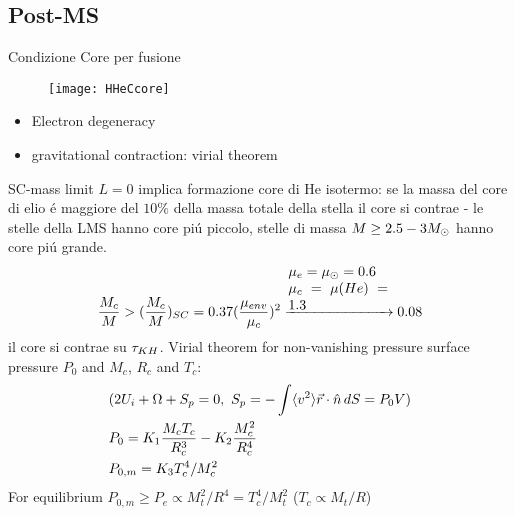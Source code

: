 \subsection{Post-MS}

\begin{frame}{Condizione Core per fusione}
\begin{figure}[!ht]
\texttt{[image: HHeCcore]}\label{fig:HHeCcore}
\end{figure}
\begin{itemize}
    \item Electron degeneracy
    \item gravitational contraction: virial theorem
\end{itemize}
\end{frame}

\begin{frame}{SC-mass limit}
$L=0$ implica formazione core di He isotermo: se la massa del core di elio \'e maggiore del $10\%$ della massa totale della stella il core si contrae - le stelle della LMS hanno core pi\'u piccolo, stelle di massa $M\geq2.5-3M_{\odot}{}$  hanno core pi\'u grande.
\begin{equation*}
\frac{M_c}{M}>(\frac{M_c}{M})_{SC}=0.37(\frac{\mu_{env}}{\mu_c})^2\xrightarrow{\parbox{2.5cm}{$\mu_e=\mu_{\odot}=0.6$\\$\mu_c=\mu(He)=1.3$}}0.08
\end{equation*}
il core si contrae su $\tau_{KH}{}$.
Virial theorem for non-vanishing pressure surface pressure $P_0$ and $M_c$, $R_c$ and $T_c$:
\begin{align*}
&(2U_i+\Omega+S_p=0,\ S_p=-\int\exv{v^2}\Vec{r}\cdot\hat{n}\,dS=P_0V)\\
&P_0=K_1\frac{M_cT_c}{R_c^3}-K_2\frac{M_c^2}{R_c^4}\\
&P_{0,m}=K_3T_c^4/M_c^2
\end{align*}
For equilibrium $P_{0,m}\geq P_e\propto M_t^2/R^4=T_c^4/M_t^2$ ($T_c\propto M_t/R$)
\end{frame}

